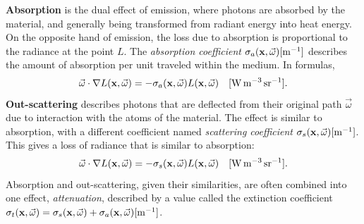 \textbf{Absorption} is the dual effect of emission, where photons are absorbed by the material, and generally being transformed from radiant energy into heat energy. On the opposite hand of emission, the loss due to absorption is proportional to the radiance at the point $L$. The \emph{absorption coefficient} $\sigma_a(\mathbf{x}, \vec{\omega})  [\SI{}{\per \metre}] $ describes the amount of absorption per unit traveled within the medium. In formulas,
\begin{equation*}
\vec{\omega} \cdot \nabla L(\mathbf{x}, \vec{\omega}) = - \sigma_a(\mathbf{x}, \vec{\omega}) L(\mathbf{x}, \vec{\omega}) \siunit{\watt \per \cubic \metre \per \steradian}.
 \end{equation*}
\textbf{Out-scattering} describes photons that are deflected from their original path $\vec{\omega}$  due to interaction with the atoms of the material. The effect is similar to absorption, with a different coefficient named \emph{scattering coefficient} $\sigma_s(\mathbf{x}, \vec{\omega}) [\SI{}{\per \metre}]$. This gives a loss of radiance that is similar to absorption:
\begin{equation*}
\vec{\omega} \cdot \nabla L(\mathbf{x}, \vec{\omega}) = - \sigma_s(\mathbf{x}, \vec{\omega}) L(\mathbf{x}, \vec{\omega})
 \siunit{\watt \per \cubic \metre \per \steradian}.
\end{equation*}
Absorption and out-scattering, given their similarities, are often combined into one effect, \emph{attenuation}, described by a value called the extinction coefficient $\sigma_t(\mathbf{x}, \vec{\omega}) =\sigma_s(\mathbf{x}, \vec{\omega}) + \sigma_a(\mathbf{x}, \vec{\omega}) [\SI{}{\per \metre}]$.


